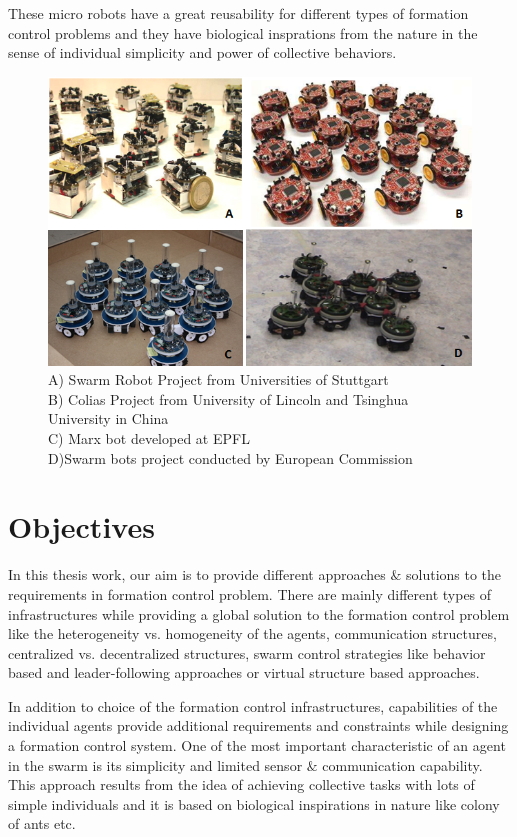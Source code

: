 These micro robots have a great reusability for different types of formation control problems  and they have biological insprations from the nature in the sense of individual simplicity and power of collective behaviors.

	\begin{figure}[H]
		\caption{A) Swarm Robot Project from Universities of Stuttgart  \\
            			B) Colias Project from University of Lincoln and Tsinghua University in China\\
			            C) Marx bot developed at EPFL \\
            			D)Swarm bots project conducted by  European Commission			}
		\centering
		\includegraphics[scale = 1]{mobilerobots}
	\end{figure} 


\section{Objectives}


In this thesis work, our aim is to provide different approaches $\&$ solutions to the requirements in formation control problem.  There are mainly different types of  infrastructures while providing a global solution to the formation control problem like the heterogeneity vs. homogeneity of the agents, communication structures, centralized vs. decentralized structures, swarm control strategies like behavior based and leader-following approaches or virtual structure based approaches. 

In addition to choice of the formation control infrastructures, capabilities of the individual agents provide additional requirements and constraints while designing a formation control system. One of the most important characteristic of an agent in the swarm is its simplicity and limited sensor $\&$ communication capability. This approach results from the idea of achieving collective tasks with lots of simple individuals  and it is based on biological inspirations in nature like colony of ants etc.

